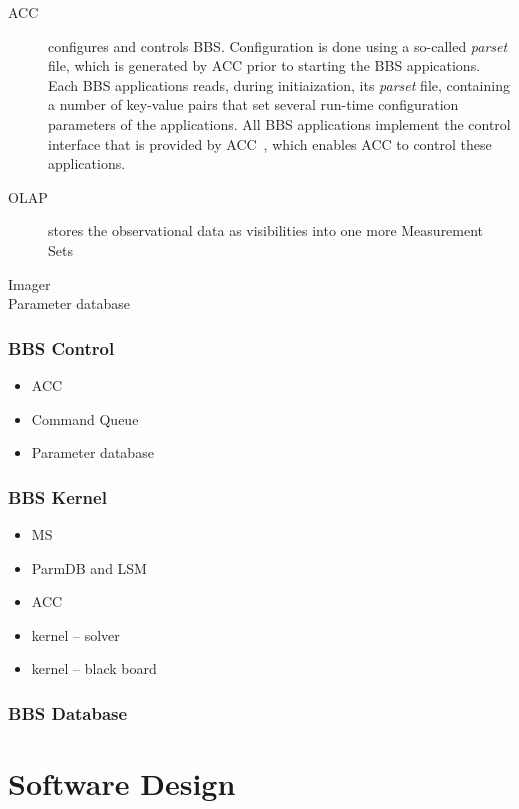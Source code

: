 \documentclass[10pt]{lofar}
\begin{document}
\begin{description}
\item [ACC] configures and controls BBS. Configuration is done using a so-called \emph{parset} file, which is generated by ACC prior to starting the BBS appications. Each BBS applications reads, during initiaization, its \emph{parset} file, containing a number of key-value pairs that set several run-time configuration parameters of the applications. All BBS applications implement the control interface that is provided by ACC~\cite{LOFAR-ASTRON-SDD-037}, which enables ACC to control these applications.
\item [OLAP] stores the observational data as visibilities into one more Measurement Sets
\item [Imager]
\item [Parameter database]
\end{description}

\subsubsection{BBS Control}
\label{subsubsec:interf-control}

\begin{itemize}
\item ACC
\item Command Queue
\item Parameter database
\end{itemize}

\subsubsection{BBS Kernel}
\label{subsubsec:interf-kernel}

\begin{itemize}
\item MS
\item ParmDB and LSM
\item ACC
\item kernel -- solver
\item kernel -- black board
\end{itemize}

\subsubsection{BBS Database}
\label{subsubsec:interf-database}

\cleardoublepage

\section{Software Design}
\label{sec:software-design}
\end{document}
